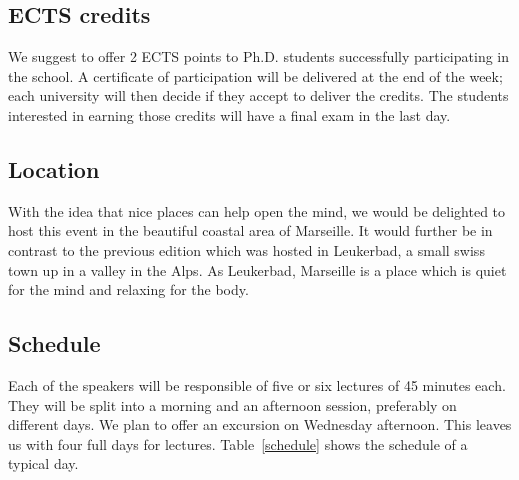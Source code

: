 \documentclass[a4paper]{scrartcl}
\begin{document}
\subsection{ECTS credits}

We suggest to offer 2 ECTS points to Ph.D. students successfully participating
in the school. A certificate of participation will be delivered at the end of
the week; each university will then decide if they accept to deliver the
credits. The students interested in earning those credits will have a final exam
in the last day.


\subsection{Location}

With the idea that nice places can help open the mind, we would be delighted to
host this event in the beautiful coastal area of Marseille. It would further be
in contrast to the previous edition which was hosted in Leukerbad, a small swiss
town up in a valley in the Alps. As Leukerbad, Marseille is a place which is
quiet for the mind and relaxing for the body. 

\subsection{Schedule}

Each of the speakers will be responsible of five or six lectures of 45 minutes
each. They will be split into a morning and an afternoon session, preferably on
different days. We plan to offer an excursion on Wednesday afternoon. This
leaves us with four full days for lectures. Table~\ref{schedule} shows the
schedule of a typical day.
\end{document}
